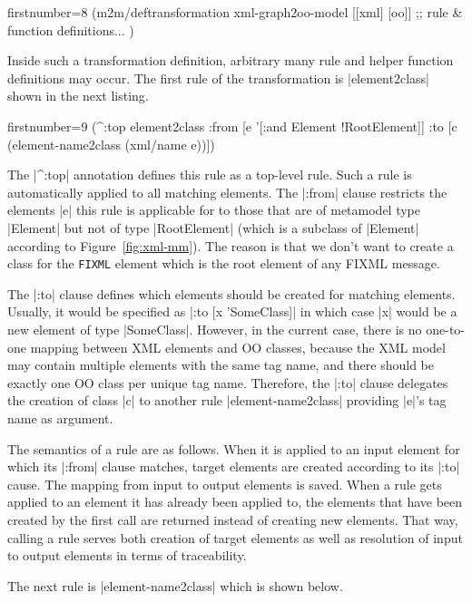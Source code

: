 \documentclass[submission]{eptcs}
\newcommand{\code}{\clojureinline}
\begin{document}
\begin{clojurecode*}{firstnumber=8}
(m2m/deftransformation xml-graph2oo-model [[xml] [oo]]
  ;; rule & function definitions...
  )
\end{clojurecode*}

Inside such a transformation definition, arbitrary many rule and helper
function definitions may occur.  The first rule of the transformation is
\code|element2class| shown in the next listing.

\begin{clojurecode*}{firstnumber=9}
  (^:top element2class
   :from [e '[:and Element !RootElement]]
   :to   [c (element-name2class (xml/name e))])
\end{clojurecode*}

The \code|^:top| annotation defines this rule as a top-level rule.  Such a rule
is automatically applied to all matching elements.  The \code|:from| clause
restricts the elements \code|e| this rule is applicable for to those that are
of metamodel type \code|Element| but not of type \code|RootElement| (which is a
subclass of \code|Element| according to Figure~\ref{fig:xml-mm}).  The reason
is that we don't want to create a class for the \texttt{FIXML} element which is
the root element of any FIXML message.

The \code|:to| clause defines which elements should be created for matching
elements.  Usually, it would be specified as \code|:to [x 'SomeClass]| in which
case \code|x| would be a new element of type \code|SomeClass|.  However, in the
current case, there is no one-to-one mapping between XML elements and OO
classes, because the XML model may contain multiple elements with the same tag
name, and there should be exactly one OO class per unique tag name.  Therefore,
the \code|:to| clause delegates the creation of class \code|c| to another rule
\code|element-name2class| providing \code|e|'s tag name as argument.

The semantics of a rule are as follows.  When it is applied to an input element
for which its \code|:from| clause matches, target elements are created
according to its \code|:to| cause.  The mapping from input to output elements
is saved.  When a rule gets applied to an element it has already been applied
to, the elements that have been created by the first call are returned instead
of creating new elements.  That way, calling a rule serves both creation of
target elements as well as resolution of input to output elements in terms of
traceability.

The next rule is \code|element-name2class| which is shown below.
\end{document}
